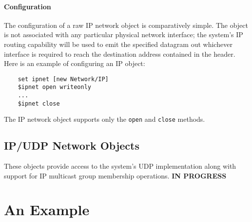 \paragraph{Configuration}
The configuration of a raw IP network object is comparatively
simple.
The object is not associated with any particular physical network
interface; the system's IP routing capability will be used to
emit the specified datagram out whichever interface is required
to reach the destination address contained in the header.
Here is an example of configuring an IP object:
\begin{verbatim}
    set ipnet [new Network/IP]
    $ipnet open writeonly
    ...
    $ipnet close
\end{verbatim}
The IP network object supports only the {\tt open} and {\tt close}
methods.

\subsection{IP/UDP Network Objects}

These objects provide access to the system's UDP implementation
along with support for IP multicast group membership operations.
{\bf IN PROGRESS}

\section{An Example}

